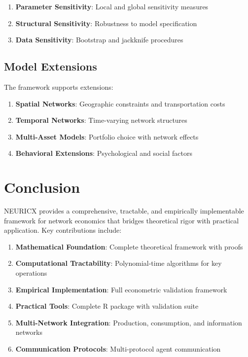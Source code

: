 \documentclass[12pt,a4paper]{article}
\begin{document}
\begin{enumerate}
\item \textbf{Parameter Sensitivity}: Local and global sensitivity measures
\item \textbf{Structural Sensitivity}: Robustness to model specification
\item \textbf{Data Sensitivity}: Bootstrap and jackknife procedures
\end{enumerate}

\subsection{Model Extensions}

The framework supports extensions:

\begin{enumerate}
\item \textbf{Spatial Networks}: Geographic constraints and transportation costs
\item \textbf{Temporal Networks}: Time-varying network structures
\item \textbf{Multi-Asset Models}: Portfolio choice with network effects
\item \textbf{Behavioral Extensions}: Psychological and social factors
\end{enumerate}

\section{Conclusion}

NEURICX provides a comprehensive, tractable, and empirically implementable framework for network economics that bridges theoretical rigor with practical application. Key contributions include:

\begin{enumerate}
\item \textbf{Mathematical Foundation}: Complete theoretical framework with proofs
\item \textbf{Computational Tractability}: Polynomial-time algorithms for key operations
\item \textbf{Empirical Implementation}: Full econometric validation framework
\item \textbf{Practical Tools}: Complete R package with validation suite
\item \textbf{Multi-Network Integration}: Production, consumption, and information networks
\item \textbf{Communication Protocols}: Multi-protocol agent communication
\end{enumerate}
\end{document}
